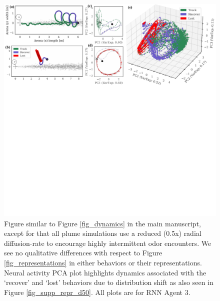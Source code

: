 \documentclass[5p,twocolumn,authoryear]{elsarticle}
\begin{document}
\begin{figure}[h!]
\centering
\includegraphics[width=0.99\linewidth]{fig_dynamics_d50.pdf}
\caption{
Figure similar to Figure \ref{fig_dynamics} in the main manuscript, except for that all plume simulations use a reduced (0.5x) radial diffusion-rate to encourage highly intermittent odor encounters. 
We see no qualitative differences with respect to Figure \ref{fig_representations} in either behaviors or their representations.
Neural activity PCA plot highlights dynamics associated with the `recover' and `lost' behaviors due to distribution shift as also seen in Figure \ref{fig_supp_repr_d50}.
All plots are for RNN Agent 3.
}
\end{figure}
\end{document}
